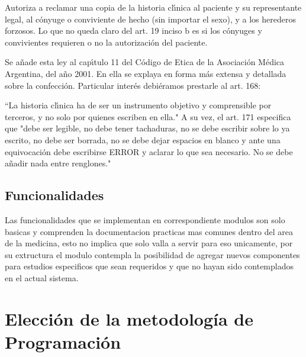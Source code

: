 Autoriza a reclamar una copia de la historia cl\'{\i}nica al paciente y su representante 
legal, al c\'onyuge o conviviente de hecho (sin importar el sexo), y a los herederos 
forzosos. Lo que no queda claro del art. 19 inciso b es si los c\'onyuges y 
convivientes requieren o no la autorizaci\'on del paciente.

Se a\~nade esta ley al cap\'{\i}tulo 11 del C\'odigo de Etica de la Asociaci\'on M\'edica 
Argentina, del a\~no 2001. En ella se explaya en forma m\'as extensa y detallada sobre
la confecci\'on. Particular inter\'es debi\'eramos prestarle al art. 168:

``La historia cl\'{\i}nica ha de ser un instrumento objetivo y comprensible por terceros,
y no solo por quienes escriben en ella." A su vez, el art. 171 especifica que 
"debe ser legible, no debe tener tachaduras, no se debe escribir sobre lo ya 
escrito, no debe ser borrada, no se debe dejar espacios en blanco y ante una
equivocaci\'on debe escribirse ERROR y aclarar lo que sea necesario. No se debe a\~nadir
nada entre renglones."


\subsection{Funcionalidades}

Las funcionalidades que se implementan en correspondiente modulos son solo
basicas y comprenden la documentacion practicas mas comunes dentro del area de la 
medicina, esto no implica que solo valla a servir para eso unicamente, por su 
extructura el modulo contempla la posibilidad de agregar nuevos componentes para 
estudios especificos que sean requeridos y que no hayan sido contemplados en el 
actual sistema.







\section{Elecci\'on de la metodolog\'ia de Programaci\'on}

